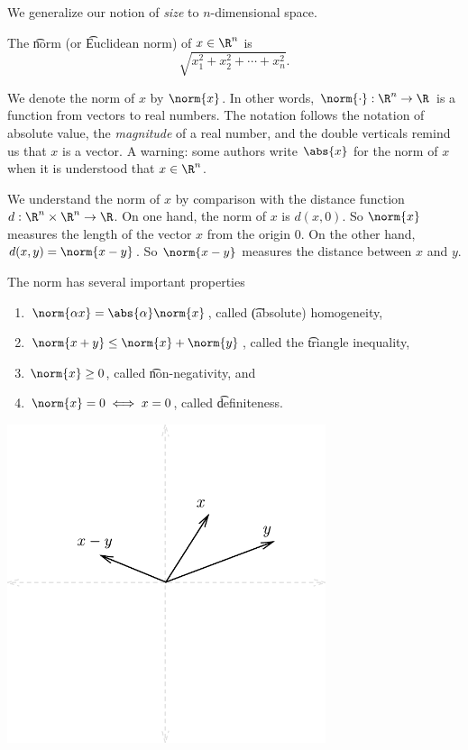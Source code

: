 
We generalize our notion of \textit{size} to $n$-dimensional space.

The \t{norm} (or \t{Euclidean norm}) of $x \in \R^n$ is
  \[
\sqrt{x_1^2 + x_2^2 + \cdots + x_n^2}.
  \]

We denote the norm of $x$ by $\norm{x}$.
In other words, $\norm{\cdot}: \R^n \to \R$ is a function from vectors to real numbers.
The notation follows the notation of absolute value, the \textit{magnitude} of a real number, and the double verticals remind us that $x$ is a vector.
A warning: some authors write $\abs{x}$ for the norm of $x$ when it is understood that $x \in \R^n$.

We understand the norm of $x$ by comparison with the distance function $d: \R^n \times \R^n \to \R$.
On one hand, the norm of $x$ is $d(x, 0)$.
So $\norm{x}$ measures the length of the vector $x$ from the origin $0$.
On the other hand, $d(x, y) = \norm{x - y}$.
So $\norm{x - y}$ measures the distance between $x$ and $y$.

The norm has several important properties
  \begin{enumerate}
  \item $\norm{\alpha x} = \abs{\alpha}\norm{x}$, called \t{(absolute) homogeneity},
  \item $\norm{x + y} \leq \norm{x} + \norm{y}$, called the \t{triangle inequality},
  \item $\norm{x} \geq 0$, called \t{non-negativity}, and
  \item $\norm{x} = 0 \iff x = 0$, called \t{definiteness}.
  \end{enumerate}

\begin{center}
\includegraphics[width=0.7\textwidth]{graphics/x-y}
\end{center}
